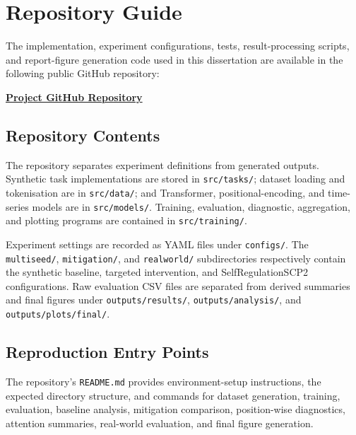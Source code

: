 \documentclass[
    author={Aanchala Ravindra Bhongade},
    supervisor={Dr. Fernando Moreno-Pino},
    degree={MSc},
    title={Length Generalisation in Transformer-Based Sequence Models: Failure Taxonomy and Mitigation Strategies},
    subtitle={},
    type={},
    year={2026}
]{dissertation}
\begin{document}

\chapter{Repository Guide}
\label{app:software-repository}

\noindent
The implementation, experiment configurations, tests, result-processing scripts, and report-figure generation code used in this dissertation are available in the following public GitHub repository:

\begin{center}
\href{https://github.com/Aanchala14/Length-Generalisation-in-Sequence-Models-Failure-Taxonomy-and-Mitigation-Strategies}
{\large\textbf{Project GitHub Repository}}
\end{center}

\section{Repository Contents}

The repository separates experiment definitions from generated outputs. Synthetic task implementations are stored in \texttt{src/tasks/}; dataset loading and tokenisation are in \texttt{src/data/}; and Transformer, positional-encoding, and time-series models are in \texttt{src/models/}. Training, evaluation, diagnostic, aggregation, and plotting programs are contained in \texttt{src/training/}.

Experiment settings are recorded as YAML files under \texttt{configs/}. The \texttt{multiseed/}, \texttt{mitigation/}, and \texttt{realworld/} subdirectories respectively contain the synthetic baseline, targeted
intervention, and SelfRegulationSCP2 configurations. Raw evaluation CSV files are separated from derived summaries and final figures under \texttt{outputs/results/}, \texttt{outputs/analysis/}, and
\texttt{outputs/plots/final/}.

\section{Reproduction Entry Points}

The repository's \texttt{README.md} provides environment-setup instructions, the expected directory structure, and commands for dataset generation, training, evaluation, baseline analysis, mitigation comparison, position-wise diagnostics, attention summaries, real-world evaluation, and final figure generation.
\end{document}
